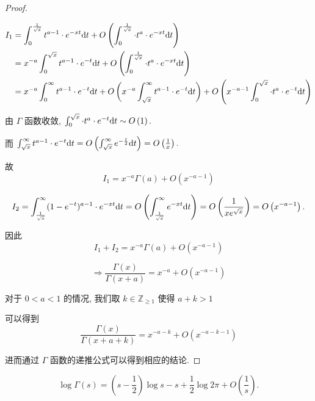 \begin{proof}
	\begin{center}
		$
		\begin{aligned}
			I_1 &= \int_0^{\frac 1 {\sqrt x}} t^{a-1}\cdot e^{-xt} \text {d} t +O\left(\int_0^{\frac {1} {\sqrt x}}\cdot t^a\cdot e^{-xt}\text {d} t\right) \\
			&= x^{-a}\int_0^{\sqrt x} t^{a-1}\cdot e^{-t} \text {d} t + O\left(\int_0^{\frac 1 {\sqrt x}}\cdot t^a\cdot e^{-xt}\text {d} t\right) \\
			&= x^{-a}\int_0^\infty t^{a-1}\cdot e^{-t} \text {d} t + O\left(x^{-a}\int_{\sqrt x}^\infty t^{a-1}\cdot e^{-t} \text {d} t\right) + O\left(x^{-a-1}\int_0^{{\sqrt x}}\cdot t^a\cdot e^{-t}\text {d} t\right) \\
		\end{aligned}
		$
	\end{center}

	由 $\Gamma$ 函数收敛, $\int_0^{{\sqrt x}}\cdot t^a\cdot e^{-t}\text {d} t \sim O\left(1\right).$

	而 $\int_{\sqrt x}^\infty t^{a-1}\cdot e^{-t} \text {d} t = O\left(\int_{\sqrt x}^\infty e^{-\frac t 2}\text {d} t\right)=O\left(\frac 1 x\right).$

	故
	$$I_1=x^{-a}\Gamma(a)+O\left(x^{-a-1}\right)$$

	$$I_2=\int_{\frac 1 {\sqrt x}}^\infty (1-e^{-t})^{a-1}\cdot e^{-xt}\text {d} t=O\left(\int_{\frac 1 {\sqrt x}}^\infty e^{-xt}\text {d} t\right)=O\left(\dfrac 1 {xe^{\sqrt x}}\right)=O\left(x^{-a-1}\right).$$

	因此
	$$I_1+I_2=x^{-a}\Gamma(a)+O(x^{-a-1})$$

	$$\Rightarrow \dfrac{\Gamma(x)}{\Gamma(x+a)}=x^{-a}+O(x^{-a-1})$$

	对于 $0<a<1$ 的情况, 我们取 $k\in \mathbb{Z}_{\geqslant 1}$ 使得 $a+k>1$

	可以得到 $$\dfrac{\Gamma(x)}{\Gamma(x+a+k)}=x^{-a-k}+O(x^{-a-k-1})$$

	进而通过 $\Gamma$ 函数的递推公式可以得到相应的结论.
\end{proof}

\begin{theorem}[斯特林公式]
	$$\log \Gamma(s)=(s-\frac 1 2)\log s - s + \frac 1 2 \log 2 \pi +O\left(\frac 1 s\right).$$
\end{theorem}

